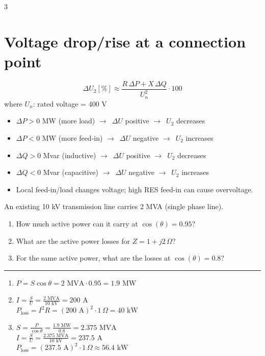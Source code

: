 \documentclass[9pt, landscape, a4paper]{article}
\let\mathto\to
\renewcommand{\to}{\ensuremath{\mathto}\ }
\newcommand{\hr}{\vspace{0.1cm}\par\vspace{-.5\ht\strutbox}\noindent\rule{\linewidth}{.5pt}\par\vspace{0.1cm}}
\begin{document}
\begin{multicols*}{3}
\section{Voltage drop/rise at a connection point}
\[\Delta U_2[\%] \approx \frac{R\,\Delta P + X\,\Delta Q}{U_n^2}\cdot 100\]
where $U_n$: rated voltage = 400 V
\vspace*{-.2cm}
\begin{itemize}
  \item $\Delta P > 0$ MW (more load) \to $\Delta U$ positive \to $U_2$ decreases
  \item $\Delta P < 0$ MW (more feed-in) \to $\Delta U$ negative \to $U_2$ increases
  \item $\Delta Q > 0$ Mvar (inductive) \to $\Delta U$ positive \to $U_2$ decreases
  \item $\Delta Q < 0$ Mvar (capacitive) \to $\Delta U$ negative \to $U_2$ increases
  \item Local feed-in/load changes voltage; high RES feed-in can cause overvoltage.
\end{itemize}

\begin{exercisebox}
  An existing 10 kV transmission line carries 2 MVA (single phase line).
  \begin{enumerate}[label=\arabic*.]
    \item How much active power can it carry at $\cos(\theta)=0.95$?
    \item What are the active power losses for $Z = 1 + j2\,\Omega$?
    \item For the same active power, what are the losses at $\cos(\theta)=0.8$?
  \end{enumerate}
  \hr
  \begin{enumerate}[label=\arabic*.]
    \item $P = S\cos\theta = 2\text{ MVA}\cdot0.95 = 1.9\text{ MW}$
    \item $I = \frac{S}{U} = \frac{2\text{ MVA}}{10\text{ kV}} = 200\text{ A}$\\
      $P_\text{loss} = I^2R = (200\text{ A})^2\cdot1\,\Omega = 40\text{ kW}$
    \item $S = \frac{P}{\cos\theta} = \frac{1.9\text{ MW}}{0.8} = 2.375\text{ MVA}$\\
      $I = \frac{S}{U} = \frac{2.375\text{ MVA}}{10\text{ kV}} = 237.5\text{ A}$\\
      $P_\text{loss} = (237.5\text{ A})^2\cdot1\,\Omega \approx 56.4\text{ kW}$
  \end{enumerate}
\end{exercisebox}


\end{multicols*}
\end{document}
